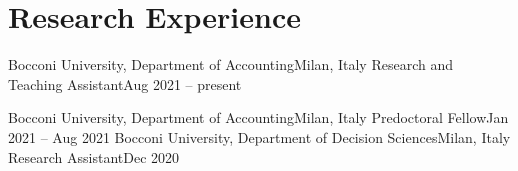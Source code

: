 \section{Research Experience}
  \resumeSubHeadingListStart
    \resumeSubheading
      {Bocconi University, Department of Accounting}{Milan, Italy}
      {Research and Teaching Assistant}{Aug 2021 -- present}
    
    \resumeSubheading
      {Bocconi University, Department of Accounting}{Milan, Italy}
      {Predoctoral Fellow}{Jan 2021 -- Aug 2021} 
    \resumeSubheading
      {Bocconi University, Department of Decision Sciences}{Milan, Italy}
      {Research Assistant}{Dec 2020} 
  \resumeSubHeadingListEnd
